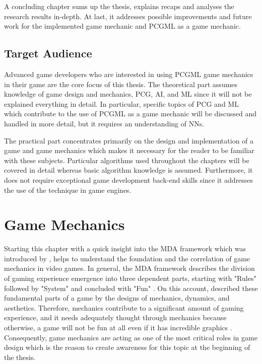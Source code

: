 \documentclass[MGS,Master,english]{twbook}%
\begin{document}
A concluding chapter sums up the thesis, explains recaps and analyses the research results in-depth. At last, it addresses possible improvements and future work for the implemented game mechanic and PCGML as a game mechanic.

\section{Target Audience}
Advanced game developers who are interested in using PCGML game mechanics in their game are the core focus of this thesis. The theoretical part assumes knowledge of game design and mechanics, PCG, \ac{AI}, and ML since it will not be explained everything in detail. In particular, specific topics of PCG and ML which contribute to the use of PCGML as a game mechanic will be discussed and handled in more detail, but it requires an understanding of \acp{NN}.

The practical part concentrates primarily on the design and implementation of a game and game mechanics which makes it necessary for the reader to be familiar with these subjects. Particular algorithms used throughout the chapters will be covered in detail whereas basic algorithm knowledge is assumed. Furthermore, it does not require exceptional game development back-end skills since it addresses the use of the technique in game engines.

%
%
\clearpage
\chapter{Game Mechanics} \label{gameMechanicsChapter}
Starting this chapter with a quick insight into the \ac{MDA} framework which was introduced by \citep{mechanic::MDA}, helps to understand the foundation and the correlation of game mechanics in video games. In general, the MDA framework describes the division of gaming experience emergence into three dependent parts, starting with "Rules" followed by "System" and concluded with "Fun" \cite{mechanic::MDA}.  On this account, \citep{mechanic::MDA} described these fundamental parts of a game by the designs of mechanics, dynamics, and aesthetics. Therefore, mechanics contribute to a significant amount of gaming experience, and it needs adequately thought through mechanics because otherwise, a game will not be fun at all even if it has incredible graphics \cite{gameDesign::gameMechanicsAdvancedGameDesign}. Consequently, game mechanics are acting as one of the most critical roles in game design which is the reason to create awareness for this topic at the beginning of the thesis.
\end{document}
